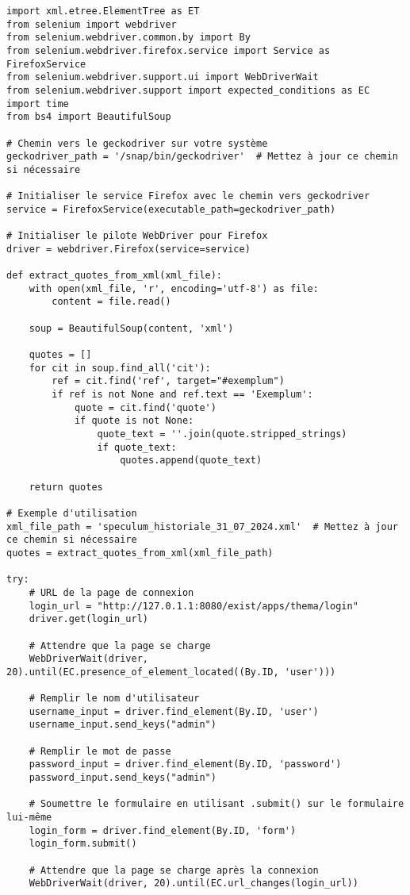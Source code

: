 \begin{lstlisting}[breaklines=true]
import xml.etree.ElementTree as ET
from selenium import webdriver
from selenium.webdriver.common.by import By
from selenium.webdriver.firefox.service import Service as FirefoxService
from selenium.webdriver.support.ui import WebDriverWait
from selenium.webdriver.support import expected_conditions as EC
import time
from bs4 import BeautifulSoup

# Chemin vers le geckodriver sur votre système
geckodriver_path = '/snap/bin/geckodriver'  # Mettez à jour ce chemin si nécessaire

# Initialiser le service Firefox avec le chemin vers geckodriver
service = FirefoxService(executable_path=geckodriver_path)

# Initialiser le pilote WebDriver pour Firefox
driver = webdriver.Firefox(service=service)

def extract_quotes_from_xml(xml_file):
	with open(xml_file, 'r', encoding='utf-8') as file:
		content = file.read()

	soup = BeautifulSoup(content, 'xml')

	quotes = []
	for cit in soup.find_all('cit'):
		ref = cit.find('ref', target="#exemplum")
		if ref is not None and ref.text == 'Exemplum':
			quote = cit.find('quote')
			if quote is not None:
				quote_text = ''.join(quote.stripped_strings)
				if quote_text:
					quotes.append(quote_text)

	return quotes

# Exemple d'utilisation
xml_file_path = 'speculum_historiale_31_07_2024.xml'  # Mettez à jour ce chemin si nécessaire
quotes = extract_quotes_from_xml(xml_file_path)

try:
	# URL de la page de connexion
	login_url = "http://127.0.1.1:8080/exist/apps/thema/login"
	driver.get(login_url)

	# Attendre que la page se charge
	WebDriverWait(driver, 20).until(EC.presence_of_element_located((By.ID, 'user')))

	# Remplir le nom d'utilisateur
	username_input = driver.find_element(By.ID, 'user')
	username_input.send_keys("admin")

	# Remplir le mot de passe
	password_input = driver.find_element(By.ID, 'password')
	password_input.send_keys("admin")

	# Soumettre le formulaire en utilisant .submit() sur le formulaire lui-même
	login_form = driver.find_element(By.ID, 'form')
	login_form.submit()

	# Attendre que la page se charge après la connexion
	WebDriverWait(driver, 20).until(EC.url_changes(login_url))


\end{lstlisting}
